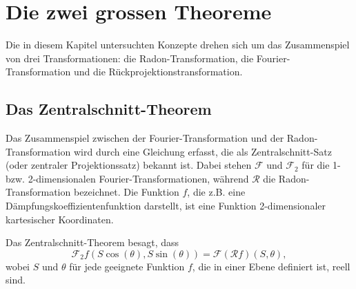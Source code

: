 %
%
%
%
\section{Die zwei grossen Theoreme
	\label{ct:section:theoreme}}
Die in diesem Kapitel untersuchten Konzepte drehen sich um das Zusammenspiel von drei Transformationen: die Radon-Transformation, die Fourier-Transformation und die Rückprojektionstransformation.

\subsection{Das Zentralschnitt-Theorem
	\label{ct:subsection:zentralschnitt}}
Das Zusammenspiel zwischen der Fourier-Transformation und der Radon-Transformation wird durch eine Gleichung erfasst, die als Zentralschnitt-Satz (oder zentraler Projektionssatz) bekannt ist. Dabei stehen $\mathscr{F}$ und $\mathscr{F}_2$ für die 1- bzw. 2-dimensionalen Fourier-Transformationen, während $\mathscr{R}$ die Radon-Transformation bezeichnet. Die Funktion $f$, die z.B. eine Dämpfungskoeffizientenfunktion darstellt, ist eine Funktion 2-dimensionaler kartesischer Koordinaten.

Das Zentralschnitt-Theorem besagt, dass
\begin{equation}\label{2dFourier1}
	\mathscr{F}_2f(S\cos(\theta), S\sin(\theta)) = \mathscr{F}(\mathscr{R}f)(S, \theta),
\end{equation}
wobei $S$ und $\theta$ für jede geeignete Funktion $f$, die in einer Ebene definiert ist, reell sind.

